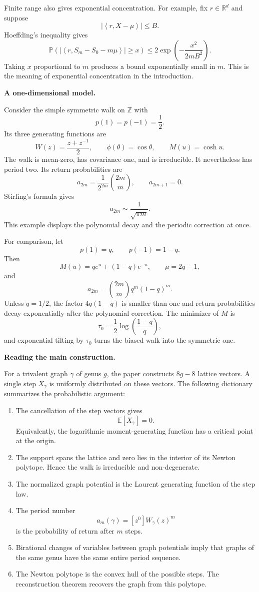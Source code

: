 Finite range also gives exponential
concentration. For example, fix
$r\in\mathbb R^d$ and suppose
$$
|\left\langle{}
r,X-\mu\right\rangle{}|\leq B.
$$
Hoeffding's inequality gives
$$
\mathbb P
 (|\left\langle{}
 r,S_m-S_0-m\mu\right\rangle{}|
 \geq x)
\leq
2\exp\left(-\frac{x^2}{2mB^2}\right).
$$
Taking $x$ proportional to $m$ produces a
bound exponentially small in $m$. This is
the meaning of exponential concentration
in the introduction.

\medskip\noindent
{\bf A one-dimensional model.}

Consider the simple symmetric walk on
$\mathbb Z$ with
$$
p(1)=p(-1)=\frac12.
$$
Its three generating functions are
$$
W(z)=\frac{z+z^{-1}}2,
\qquad
\phi(\theta)=\cos\theta,
\qquad
M(u)=\cosh u.
$$
The walk is mean-zero, has covariance one,
and is irreducible. It nevertheless has
period two. Its return probabilities are
$$
a_{2m}
=\frac{1}{2^{2m}}\binom{2m}{m},
\qquad
a_{2m+1}=0.
$$
Stirling's formula gives
$$
a_{2m}\sim\frac{1}{\sqrt{\pi m}}.
$$
This example displays the polynomial decay
and the periodic correction at once.

For comparison, let
$$
p(1)=q,
\qquad
p(-1)=1-q.
$$
Then
$$
M(u)=qe^u+(1-q)e^{-u},
\qquad
\mu=2q-1,
$$
and
$$
a_{2m}
=\binom{2m}{m}q^m(1-q)^m.
$$
Unless $q=1/2$, the factor
$4q(1-q)$ is smaller than one and return
probabilities decay exponentially after
the polynomial correction. The minimizer
of $M$ is
$$
\tau_0
=\frac12\log\left(\frac{1-q}{q}\right),
$$
and exponential tilting by $\tau_0$ turns
the biased walk into the symmetric one.

\medskip\noindent
{\bf Reading the main construction.}

For a trivalent graph $\gamma$ of genus
$g$, the paper constructs $8g-8$ lattice
vectors. A single step $X_\gamma$ is
uniformly distributed on these vectors.
The following dictionary summarizes the
probabilistic argument:

\begin{enumerate}
\item The cancellation of the step vectors
gives
$$
\mathbb E[X_\gamma]=0.
$$
Equivalently, the logarithmic
moment-generating function has a critical
point at the origin.

\item The support spans the lattice and
zero lies in the interior of its Newton
polytope. Hence the walk is irreducible and
non-degenerate.

\item The normalized graph potential is
the Laurent generating function of the
step law.

\item The period number
$$
a_m(\gamma)
=[z^0]W_\gamma(z)^m
$$
is the probability of return after $m$
steps.

\item Birational changes of variables
between graph potentials imply that graphs
of the same genus have the same entire
period sequence.

\item The Newton polytope is the convex
hull of the possible steps. The
reconstruction theorem recovers the graph
from this polytope.
\end{enumerate}

